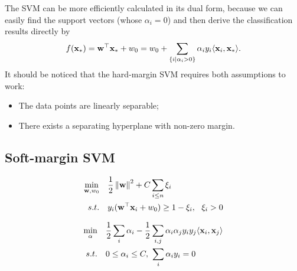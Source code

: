 \remark The SVM can be more efficiently calculated in its dual form, because we can easily find the support vectors (whose $\alpha_i = 0$) and then derive the classification results directly by
\begin{equation}
	f(\mathbf{x}_*) = \mathbf{w}^\top \mathbf{x}_* + w_0 = w_0 + \sum_{\{i \mid \alpha_i > 0\}} \alpha_i y_i \langle \mathbf{x}_i, \mathbf{x}_* \rangle.
\end{equation}
It should be noticed that the hard-margin SVM requires both assumptions to work:
\begin{itemize}
	\item The data points are linearly separable;
	\item There exists a separating hyperplane with non-zero margin.
\end{itemize}

\subsection{Soft-margin SVM}
\begin{definition}
\begin{align}
	\min_{\bfw, w_0} & \quad \onehalf \norm{\bfw}^2 + C \sum_{i \leq n} \xi_i \\
	s.t. & \quad y_i (\bfw^\top \bfx_i + w_0) \geq 1 - \xi_i,\ \ \xi_i > 0
\end{align}
\end{definition}
\begin{definition}
\begin{align}
	\min_{\alpha} & \quad \frac{1}{2} \sum_{i} \alpha_i - \frac{1}{2} \sum_{i,j} \alpha_i \alpha_j y_i y_j \langle \mathbf{x}_i, \mathbf{x}_j \rangle \\
	s.t. & \quad 0 \leq \alpha_i \leq C,\ \sum_{i} \alpha_i y_i = 0
\end{align}
\end{definition}
